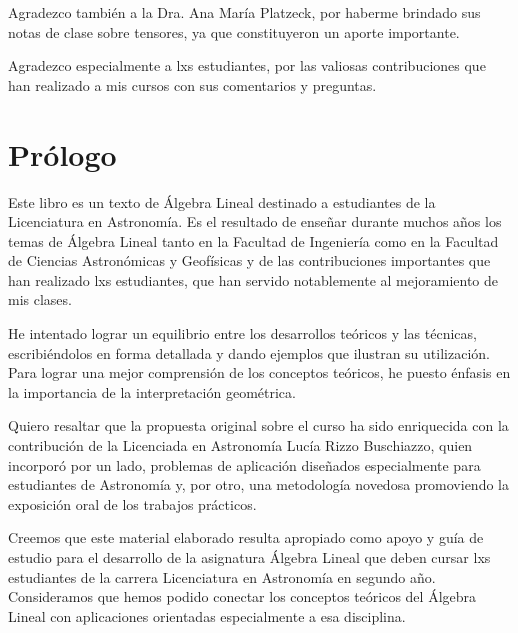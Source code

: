 \documentclass[a4paper,12pt,twopage]{book}
\begin{document}
Agradezco también a la Dra. Ana María Platzeck, por haberme brindado sus   notas de clase sobre tensores, ya que constituyeron  un aporte importante. 


Agradezco   especialmente  a lxs estudiantes, por las   valiosas contribuciones que han realizado a mis cursos   con sus comentarios y preguntas.
\chapter*{Prólogo}

Este libro es un texto de Álgebra Lineal destinado a estudiantes de la Licenciatura en Astronomía.
Es el resultado de enseñar durante muchos años los temas de Álgebra Lineal tanto en la Facultad de Ingeniería como en la Facultad de Ciencias Astronómicas y Geofísicas y de las contribuciones importantes que han realizado lxs  estudiantes, que han servido notablemente  al mejoramiento de mis clases.

He intentado lograr un equilibrio entre los desarrollos teóricos y las técnicas, escribiéndolos en forma detallada y dando ejemplos que ilustran su utilización. Para lograr una mejor comprensión de los conceptos teóricos, he puesto énfasis en la importancia de la interpretación geométrica. 


Quiero resaltar que la propuesta original sobre el curso ha sido  enriquecida con la contribución de la Licenciada en Astronomía Lucía Rizzo Buschiazzo,   quien incorporó  por un lado, problemas de aplicación diseñados especialmente para estudiantes de Astronomía y, por otro, una metodología novedosa promoviendo  la exposición oral de los trabajos prácticos.  

Creemos que este material elaborado resulta apropiado como apoyo y guía de estudio  para el desarrollo de la asignatura Álgebra Lineal que deben cursar lxs estudiantes de la carrera Licenciatura en Astronomía  en segundo año. Consideramos  que hemos podido  conectar los conceptos teóricos del Álgebra Lineal con  aplicaciones orientadas especialmente a esa disciplina. 
\end{document}
